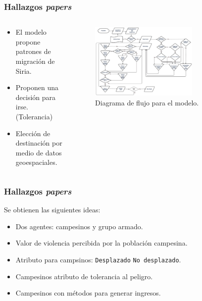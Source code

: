 \documentclass[17pt, t, lualatex]{beamer}
\begin{document}
\begin{frame}[allowframebreaks]
  \frametitle{Hallazgos \textit{papers}}
  
  \begin{columns}
    \begin{column}{.5\textwidth}
      \begin{itemize}
        \item El modelo propone patrones de migración de Siria.
        \item Proponen una decisión para irse. (Tolerancia)
        \item Elección de destinación por medio de datos geoespaciales.
      \end{itemize}
    \end{column}

    \begin{column}{.5\textwidth}
      \begin{figure}[ht]
        \centering
        \includegraphics[width=0.7\textwidth]{img/Paper1Fig1.png}
        \caption{\label{fig:p1f1} Diagrama de flujo para el modelo.\cite{suleimenova2020predicting}}
      \end{figure}

    \end{column}
  \end{columns}

\end{frame}



\begin{frame}[allowframebreaks]
  \frametitle{Hallazgos \textit{papers}}
  Se obtienen las siguientes ideas:
  \begin{itemize}
    \item Dos agentes: campesinos y grupo armado.
    \item Valor de violencia percibida por la población campesina.
    \item Atributo para campsinos: \texttt{Desplazado} \texttt{No desplazado}.
    \item Campesinos atributo de tolerancia al peligro.
    \item Campesinos con métodos para generar ingresos.
  \end{itemize}
\end{frame}
\end{document}
